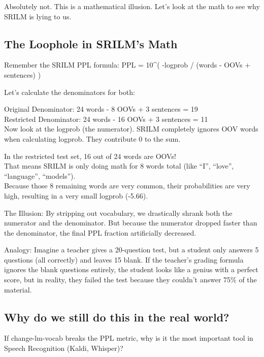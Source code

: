 \documentclass[11pt]{article}
\begin{document}
Absolutely not. This is a mathematical illusion. Let's look at the math
to see why SRILM is lying to us.

    \hypertarget{the-loophole-in-srilms-math}{%
\subsection{The Loophole in SRILM's
Math}\label{the-loophole-in-srilms-math}}

Remember the SRILM PPL formula: PPL = 10\^{}( -logprob / (words - OOVs +
sentences) )

Let's calculate the denominators for both:

Original Denominator: 24 words - 8 OOVs + 3 sentences = 19\\
Restricted Denominator: 24 words - 16 OOVs + 3 sentences = 11\\
Now look at the logprob (the numerator). SRILM completely ignores OOV
words when calculating logprob. They contribute 0 to the sum.

In the restricted test set, 16 out of 24 words are OOVs!\\
That means SRILM is only doing math for 8 words total (like ``I'',
``love'', ``language'', ``models'').\\
Because those 8 remaining words are very common, their probabilities are
very high, resulting in a very small logprob (-5.66).

The Illusion: By stripping out vocabulary, we drastically shrank both
the numerator and the denominator. But because the numerator dropped
faster than the denominator, the final PPL fraction artificially
decreased.

Analogy: Imagine a teacher gives a 20-question test, but a student only
answers 5 questions (all correctly) and leaves 15 blank. If the
teacher's grading formula ignores the blank questions entirely, the
student looks like a genius with a perfect score, but in reality, they
failed the test because they couldn't answer 75\% of the material.

    \hypertarget{why-do-we-still-do-this-in-the-real-world}{%
\subsection{Why do we still do this in the real
world?}\label{why-do-we-still-do-this-in-the-real-world}}

If change-lm-vocab breaks the PPL metric, why is it the most important
tool in Speech Recognition (Kaldi, Whisper)?
\end{document}
